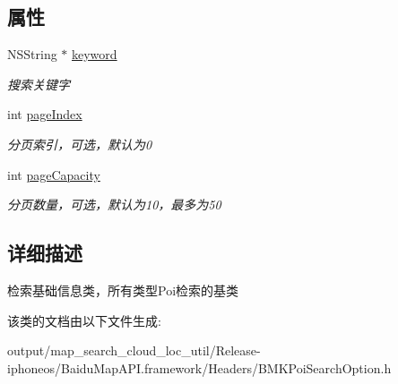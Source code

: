 \subsection*{属性}
\begin{DoxyCompactItemize}
\item 
\hypertarget{interface_b_m_k_base_poi_search_option_af74b52da74e6d70c2904774938d4358a}{}N\+S\+String $\ast$ \hyperlink{interface_b_m_k_base_poi_search_option_af74b52da74e6d70c2904774938d4358a}{keyword}\label{interface_b_m_k_base_poi_search_option_af74b52da74e6d70c2904774938d4358a}

\begin{DoxyCompactList}\small\item\em 搜索关键字 \end{DoxyCompactList}\item 
\hypertarget{interface_b_m_k_base_poi_search_option_a23b7f5ccb9cdb0c77dc80e57039be011}{}int \hyperlink{interface_b_m_k_base_poi_search_option_a23b7f5ccb9cdb0c77dc80e57039be011}{page\+Index}\label{interface_b_m_k_base_poi_search_option_a23b7f5ccb9cdb0c77dc80e57039be011}

\begin{DoxyCompactList}\small\item\em 分页索引，可选，默认为0 \end{DoxyCompactList}\item 
\hypertarget{interface_b_m_k_base_poi_search_option_a6c4467b4e1f98bebf75d59f95b6fc85d}{}int \hyperlink{interface_b_m_k_base_poi_search_option_a6c4467b4e1f98bebf75d59f95b6fc85d}{page\+Capacity}\label{interface_b_m_k_base_poi_search_option_a6c4467b4e1f98bebf75d59f95b6fc85d}

\begin{DoxyCompactList}\small\item\em 分页数量，可选，默认为10，最多为50 \end{DoxyCompactList}\end{DoxyCompactItemize}


\subsection{详细描述}
检索基础信息类，所有类型\+Poi检索的基类 

该类的文档由以下文件生成\+:\begin{DoxyCompactItemize}
\item 
output/map\+\_\+search\+\_\+cloud\+\_\+loc\+\_\+util/\+Release-\/iphoneos/\+Baidu\+Map\+A\+P\+I.\+framework/\+Headers/B\+M\+K\+Poi\+Search\+Option.\+h\end{DoxyCompactItemize}
